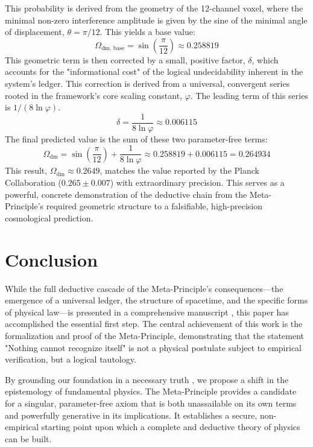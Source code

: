 \documentclass[axioms,article,submit,pdftex,oneauthor]{Definitions/mdpi}
\begin{document}
This probability is derived from the geometry of the 12-channel voxel, where the minimal non-zero interference amplitude is given by the sine of the minimal angle of displacement, \(\theta = \pi/12\). This yields a base value:
\begin{equation}
\Omega_{\text{dm, base}} = \sin\left(\frac{\pi}{12}\right) \approx 0.258819
\end{equation}
This geometric term is then corrected by a small, positive factor, \(\delta\), which accounts for the "informational cost" of the logical undecidability inherent in the system's ledger. This correction is derived from a universal, convergent series rooted in the framework's core scaling constant, \(\varphi\). The leading term of this series is \(1 / (8 \ln \varphi)\).
\begin{equation}
\delta = \frac{1}{8 \ln\varphi} \approx 0.006115
\end{equation}
The final predicted value is the sum of these two parameter-free terms:
\begin{equation}
\Omega_{\text{dm}} = \sin\left(\frac{\pi}{12}\right) + \frac{1}{8 \ln\varphi} \approx 0.258819 + 0.006115 = 0.264934
\end{equation}
This result, \(\Omega_{\text{dm}} \approx 0.2649\), matches the value reported by the Planck Collaboration (\(0.265 \pm 0.007\)) \cite{Planck2018} with extraordinary precision. This serves as a powerful, concrete demonstration of the deductive chain from the Meta-Principle's required geometric structure to a falsifiable, high-precision cosmological prediction.

\section{Conclusion}
While the full deductive cascade of the Meta-Principle's consequences—the emergence of a universal ledger, the structure of spacetime, and the specific forms of physical law—is presented in a comprehensive manuscript \cite{washburn2025zenodo}, this paper has accomplished the essential first step. The central achievement of this work is the formalization and proof of the Meta-Principle, demonstrating that the statement "Nothing cannot recognize itself" is not a physical postulate subject to empirical verification, but a logical tautology.

By grounding our foundation in a necessary truth \cite{godel1931formal}, we propose a shift in the epistemology of fundamental physics. The Meta-Principle provides a candidate for a singular, parameter-free axiom that is both unassailable on its own terms and powerfully generative in its implications. It establishes a secure, non-empirical starting point upon which a complete and deductive theory of physics can be built.
\end{document}

